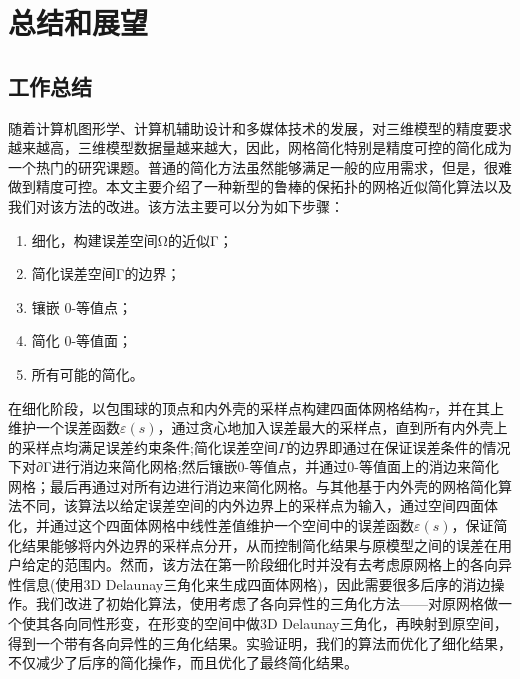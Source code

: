
\chapter{总结和展望}

\section{工作总结}
随着计算机图形学、计算机辅助设计和多媒体技术的发展，对三维模型的精度要求越来越高，三维模型数据量越来越大，因此，网格简化特别是精度可控的简化成为一个热门的研究课题。普通的简化方法虽然能够满足一般的应用需求，但是，很难做到精度可控。本文主要介绍了一种新型的鲁棒的保拓扑的网格近似简化算法以及我们对该方法的改进。该方法主要可以分为如下步骤：
\begin{enumerate}[（1）]
  \item 细化，构建误差空间Ω的近似Γ；
  \item 简化误差空间Γ的边界；
  \item 镶嵌 0-等值点；
  \item 简化 0-等值面；
  \item 所有可能的简化。
\end{enumerate}
在细化阶段，以包围球的顶点和内外壳的采样点构建四面体网格结构$\tau$，并在其上维护一个误差函数$\varepsilon(s)$，通过贪心地加入误差最大的采样点，直到所有内外壳上的采样点均满足误差约束条件;简化误差空间$\Gamma$的边界即通过在保证误差条件的情况下对∂Γ进行消边来简化网格;然后镶嵌0-等值点，并通过0-等值面上的消边来简化网格；最后再通过对所有边进行消边来简化网格。与其他基于内外壳的网格简化算法不同，该算法以给定误差空间的内外边界上的采样点为输入，通过空间四面体化，并通过这个四面体网格中线性差值维护一个空间中的误差函数$\varepsilon(s)$，保证简化结果能够将内外边界的采样点分开，从而控制简化结果与原模型之间的误差在用户给定的范围内。然而，该方法在第一阶段细化时并没有去考虑原网格上的各向异性信息(使用3D Delaunay三角化来生成四面体网格)，因此需要很多后序的消边操作。我们改进了初始化算法，使用考虑了各向异性的三角化方法——对原网格做一个使其各向同性形变，在形变的空间中做3D Delaunay三角化，再映射到原空间，得到一个带有各向异性的三角化结果。实验证明，我们的算法而优化了细化结果，不仅减少了后序的简化操作，而且优化了最终简化结果。
